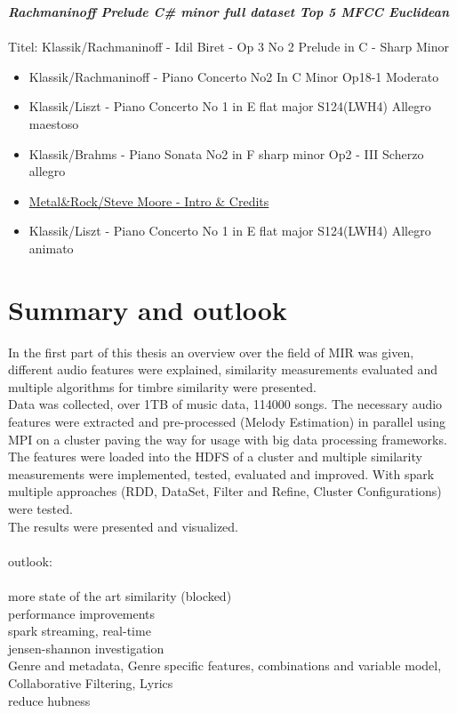 \textit{\textbf{Rachmaninoff Prelude C\# minor full dataset Top 5 MFCC Euclidean\\}}
\\
Titel: Klassik/Rachmaninoff - Idil Biret - Op 3 No 2 Prelude in C - Sharp Minor
\begin{itemize}
	\setlength\itemsep{-0.5em}
	\item Klassik/Rachmaninoff - Piano Concerto No2 In C Minor Op18-1 Moderato
	\item Klassik/Liszt - Piano Concerto No 1 in E flat major S124(LWH4) Allegro maestoso
	\item Klassik/Brahms - Piano Sonata No2 in F sharp minor Op2 - III Scherzo allegro
	\item \underline{Metal\&Rock/Steve Moore - Intro \& Credits}
	\item Klassik/Liszt - Piano Concerto No 1 in E flat major S124(LWH4) Allegro animato
\end{itemize}

\section{Summary and outlook}

In the first part of this thesis an overview over the field of MIR was given, different audio features were explained, similarity measurements evaluated and multiple algorithms for timbre similarity were presented.\\
Data was collected, over 1TB of music data, 114000 songs. The necessary audio features were extracted and pre-processed (Melody Estimation) in parallel using MPI on a cluster paving the way for usage with big data processing frameworks.\\
The features were loaded into the HDFS of a cluster and multiple similarity measurements were implemented, tested, evaluated and improved. With spark multiple approaches (RDD, DataSet, Filter and Refine, Cluster Configurations) were tested.\\
The results were presented and visualized.\\
\ \\
outlook:\\
\ \\
more state of the art similarity (blocked)\\
performance improvements\\
spark streaming, real-time\\
jensen-shannon investigation\\
Genre and metadata, Genre specific features, combinations and variable model, Collaborative Filtering, Lyrics\\
reduce hubness\\

